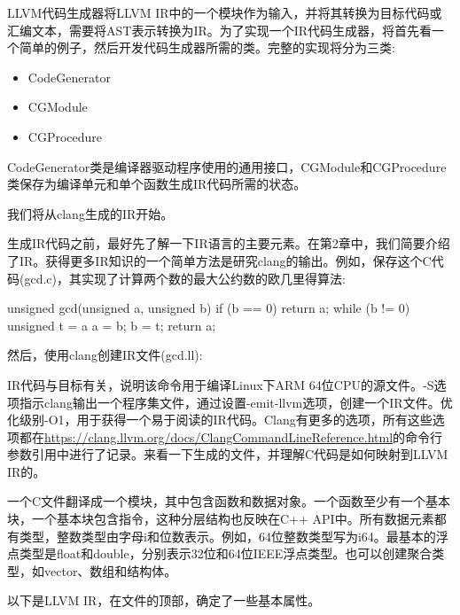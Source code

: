 
LLVM代码生成器将LLVM IR中的一个模块作为输入，并将其转换为目标代码或汇编文本，需要将AST表示转换为IR。为了实现一个IR代码生成器，将首先看一个简单的例子，然后开发代码生成器所需的类。完整的实现将分为三类:

\begin{itemize}
\item
CodeGenerator

\item
CGModule

\item
CGProcedure
\end{itemize}

CodeGenerator类是编译器驱动程序使用的通用接口，CGModule和CGProcedure类保存为编译单元和单个函数生成IR代码所需的状态。

我们将从clang生成的IR开始。


生成IR代码之前，最好先了解一下IR语言的主要元素。在第2章中，我们简要介绍了IR。获得更多IR知识的一个简单方法是研究clang的输出。例如，保存这个C代码(gcd.c)，其实现了计算两个数的最大公约数的欧几里得算法:

\begin{cpp}
unsigned gcd(unsigned a, unsigned b) {
    if (b == 0)
    return a;
    while (b != 0) {
        unsigned t = a %
        a = b;
        b = t;
    }
    return a;
}
\end{cpp}

然后，使用clang创建IR文件(gcd.ll):


IR代码与目标有关，说明该命令用于编译Linux下ARM 64位CPU的源文件。-S选项指示clang输出一个程序集文件，通过设置-emit-llvm选项，创建一个IR文件。优化级别-O1，用于获得一个易于阅读的IR代码。Clang有更多的选项，所有这些选项都在\url{https://clang.llvm.org/docs/ClangCommandLineReference.html}的命令行参数引用中进行了记录。来看一下生成的文件，并理解C代码是如何映射到LLVM IR的。

一个C文件翻译成一个模块，其中包含函数和数据对象。一个函数至少有一个基本块，一个基本块包含指令，这种分层结构也反映在C++ API中。所有数据元素都有类型，整数类型由字母i和位数表示。例如，64位整数类型写为i64。最基本的浮点类型是float和double，分别表示32位和64位IEEE浮点类型。也可以创建聚合类型，如vector、数组和结构体。

以下是LLVM IR，在文件的顶部，确定了一些基本属性。


